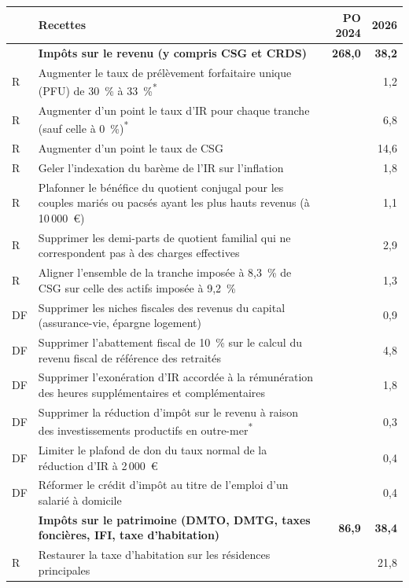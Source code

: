 \begin{center}
\begin{minipage}{\textwidth}
  \centering
  \footnotesize
  \begin{tabularx}{\textwidth}{@{}l>{\raggedright\arraybackslash}Xrr@{}}
    \toprule
    & Recettes & PO 2024 & 2026 \\
    \midrule
    & \textbf{Impôts sur le revenu (y compris CSG et CRDS)} & \textbf{268,0} & \textbf{38,2} \\
    R & Augmenter le taux de prélèvement forfaitaire unique (PFU) de 30~\% à 33~\%\textsuperscript{*} & & 1,2 \\
    R & Augmenter d'un point le taux d'IR pour chaque tranche (sauf celle à 0~\%)\textsuperscript{*} & & 6,8 \\
    R & Augmenter d'un point le taux de CSG & & 14,6 \\
    R & Geler l'indexation du barème de l'IR sur l'inflation & & 1,8 \\
    R & Plafonner le bénéfice du quotient conjugal pour les couples mariés ou pacsés ayant les plus hauts revenus (à 10\,000~€) & & 1,1 \\
    R & Supprimer les demi-parts de quotient familial qui ne correspondent pas à des charges effectives & & 2,9 \\
    R & Aligner l'ensemble de la tranche imposée à 8,3~\% de CSG sur celle des actifs imposée à 9,2~\% & & 1,3 \\
    DF & Supprimer les niches fiscales des revenus du capital (assurance-vie, épargne logement) & & 0,9 \\
    DF & Supprimer l'abattement fiscal de 10~\% sur le calcul du revenu fiscal de référence des retraités & & 4,8 \\
    DF & Supprimer l'exonération d'IR accordée à la rémunération des heures supplémentaires et complémentaires & & 1,8 \\
    DF & Supprimer la réduction d'impôt sur le revenu à raison des investissements productifs en outre-mer\textsuperscript{*} & & 0,3 \\
    DF & Limiter le plafond de don du taux normal de la réduction d'IR à 2\,000~€ & & 0,4 \\
    DF & Réformer le crédit d'impôt au titre de l'emploi d'un salarié à domicile & & 0,4 \\
    \midrule
    & \textbf{Impôts sur le patrimoine (DMTO, DMTG, taxes foncières, IFI, taxe d'habitation)} & \textbf{86,9} & \textbf{38,4} \\
    R & Restaurer la taxe d'habitation sur les résidences principales & & 21,8 \\

\end{tabularx}
\end{minipage}
\end{center}
